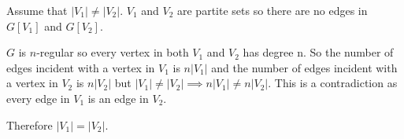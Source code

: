 Assume that $|V_1| \neq |V_2|$. 
$V_1$ and $V_2$ are partite sets so there are no edges in $G[V_1]$ and $G[V_2]$.

$G$ is $n$-regular so every vertex in both $V_1$ and $V_2$ has degree n. So the number of edges incident with a vertex in $V_1$ is $n|V_1|$ and the number of edges incident with a vertex in $V_2$ is $n|V_2|$ but $|V_1| \neq |V_2| \implies n|V_1| \neq n|V_2|$. This is a contradiction as every edge in $V_1$ is an edge in $V_2$.  

Therefore $|V_1| = |V_2|$.
